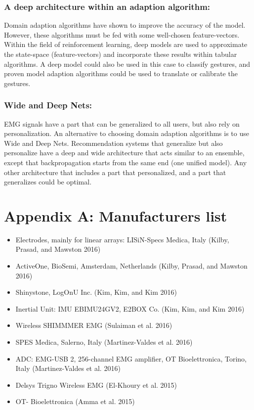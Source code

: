 \documentclass{article}
\begin{document}
\subsubsection{A deep architecture within an adaption algorithm:} Domain adaption algorithms have shown to improve the accuracy of the model. However, these algorithms must be fed with some well-chosen feature-vectors. Within the field of reinforcement learning, deep models are used to approximate the state-space (feature-vectors) and incorporate these results within tabular algorithms. A deep model could also be used in this case to classify gestures, and proven model adaption algorithms could be used to translate or calibrate the gestures.

\subsubsection{Wide and Deep Nets:} EMG signals have a part that can be generalized to all users, but also rely on personalization. An alternative to choosing domain adaption algorithms is to use Wide and Deep Nets.
Recommendation systems that generalize but also personalize have a deep and wide architecture that acts similar to an ensemble, except that backpropagation starts from the same end (one unified model). Any other architecture that includes a part that personalized, and a part that generalizes could be optimal. 

\newpage

\section{Appendix A: Manufacturers list}
\begin{itemize}
\item Electrodes, mainly for linear arrays: LISiN-Specs Medica, Italy (Kilby, Prasad, and Mawston 2016)
\item ActiveOne, BioSemi, Amsterdam, Netherlands (Kilby, Prasad, and Mawston 2016)
\item Shinystone, LogOnU Inc. (Kim, Kim, and Kim 2016)
\item Inertial Unit: IMU EBIMU24GV2, E2BOX Co. (Kim, Kim, and Kim 2016)
\item Wireless SHIMMMER EMG (Sulaiman et al. 2016)
\item SPES Medica, Salerno, Italy (Martinez-Valdes et al. 2016)
\item ADC: EMG-USB 2, 256-channel EMG amplifier, OT Bioelettronica, Torino, Italy (Martinez-Valdes et al. 2016)
\item Delsys Trigno Wireless EMG (El-Khoury et al. 2015)
\item OT- Bioelettronica (Amma et al. 2015)
\end{itemize}
\end{document}

